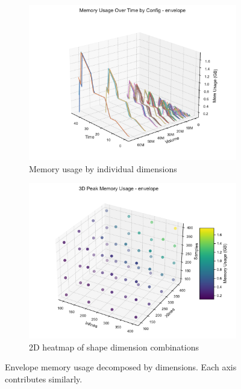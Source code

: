 \begin{figure}[htbp]
    \centering
    \begin{subfigure}[t]{0.49\textwidth}
        \includegraphics[width=\textwidth]{assets/images/05/memory_usage_by_configuration_envelope}
        \caption{Memory usage by individual dimensions}
    \end{subfigure}
    \hfill
    \begin{subfigure}[t]{0.49\textwidth}
        \includegraphics[width=\textwidth]{assets/images/05/memory_usage_inlines_xlines_samples_heatmap_envelope}
        \caption{2D heatmap of shape dimension combinations}
    \end{subfigure}
    \caption{Envelope memory usage decomposed by dimensions. Each axis contributes similarly.}
    \label{fig:memory_usage_by_configuration_envelope}
\end{figure}

